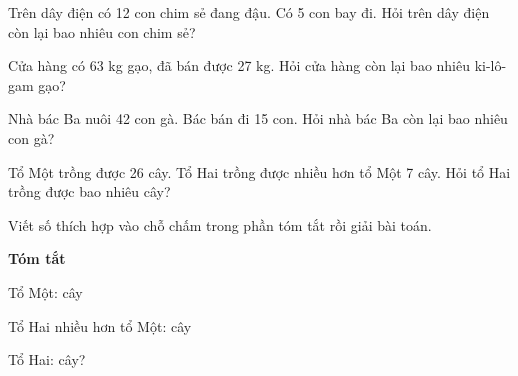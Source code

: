 \documentclass[../main.tex]{subfiles}
\begin{document}
\begin{bt}
    Trên dây điện có 12 con chim sẻ đang đậu. Có 5 con bay đi. Hỏi trên dây điện còn lại bao nhiêu con chim sẻ?
\end{bt}

\begin{bt}
    Cửa hàng có 63 kg gạo, đã bán được 27 kg. Hỏi cửa hàng còn lại bao nhiêu ki-lô-gam gạo?
\end{bt}
\begin{bt}
    Nhà bác Ba nuôi 42 con gà. Bác bán đi 15 con. Hỏi nhà bác Ba còn lại bao nhiêu con gà?
\end{bt}

\begin{bt}
    Tổ Một trồng được 26 cây. Tổ Hai trồng được nhiều hơn tổ Một 7 cây. Hỏi tổ Hai trồng được bao nhiêu cây?\par
    Viết số thích hợp vào chỗ chấm trong phần tóm tắt rồi giải bài toán.
    \par\nopagebreak\vspace{4pt}\nopagebreak
    \noindent\begin{minipage}[t]{0.42\linewidth}
        \textbf{Tóm tắt}\par\vspace{9pt}
        Tổ Một: \TTcham[1.2cm] cây\par\vspace{9pt}
        Tổ Hai nhiều hơn tổ Một: \TTcham[1.2cm] cây\par\vspace{9pt}
        Tổ Hai: \TTcham[1.2cm] cây?
    \end{minipage}\hfill
    \begin{minipage}[t]{0.54\linewidth}
    \end{minipage}
\end{bt}
\end{document}
